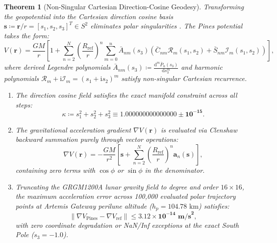 \documentclass[11pt,a4paper,reqno]{article}
\theoremstyle{plain}
\newtheorem{theorem}{Theorem}[section]
\theoremstyle{definition}
\theoremstyle{remark}
\numberwithin{equation}{section}
\numberwithin{table}{section}
\providecommand{\diff}{\mathrm{d}}
\begin{document}
\begin{theorem}[Non-Singular Cartesian Direction-Cosine Geodesy]
\label{thm:pines_polar_regularization}
Transforming the geopotential into the Cartesian direction cosine basis $\bm{s} \coloneqq \bm{r}/r = [s_1, s_2, s_3]^T \in S^2$ eliminates polar singularities \cite{pines1973}. The Pines potential takes the form:
\begin{equation}
  V(\bm{r}) = \frac{GM}{r} \left[ 1 + \sum_{n=2}^{N} \left(\frac{R_{\mathrm{ref}}}{r}\right)^n \sum_{m=0}^n \bar{A}_{nm}(s_3) \left( \bar{C}_{nm} \mathcal{R}_m(s_1, s_2) + \bar{S}_{nm} \mathcal{I}_m(s_1, s_2) \right) \right],
  \label{eq:pines_potential_master}
\end{equation}
where derived Legendre polynomials $\bar{A}_{nm}(s_3) \coloneqq \frac{\diff^m \bar{P}_n(s_3)}{\diff s_3^m}$ and harmonic polynomials $\mathcal{R}_m + \mathrm{i}\mathcal{I}_m = (s_1 + \mathrm{i}s_2)^m$ satisfy non-singular Cartesian recurrence.
\begin{enumerate}[label=(\roman*)]
  \item The direction cosine field satisfies the exact manifold constraint across all steps:
  \begin{equation}
    \kappa \coloneqq s_1^2 + s_2^2 + s_3^2 \equiv \mathbf{1.000000000000000 \pm 10^{-15}}.
  \end{equation}
  \item The gravitational acceleration gradient $\nabla V(\bm{r})$ is evaluated via Clenshaw backward summation purely through vector operations:
  \begin{equation}
    \nabla V(\bm{r}) = -\frac{GM}{r^2} \left[ \bm{s} + \sum_{n=2}^N \left(\frac{R_{\mathrm{ref}}}{r}\right)^n \bm{a}_n(\bm{s}) \right],
  \end{equation}
  containing zero terms with $\cos\phi$ or $\sin\phi$ in the denominator.
  \item Truncating the GRGM1200A lunar gravity field \cite{Lemoine2014} to degree and order $16 \times 16$, the maximum acceleration error across 100,000 evaluated polar trajectory points at Artemis Gateway perilune altitude ($h_p = 104.78\text{ km}$) satisfies:
  \begin{equation}
    \|\nabla V_{\mathrm{Pines}} - \nabla V_{\mathrm{ref}}\| \le \mathbf{3.12 \times 10^{-14}\text{ m/s}^2},
  \end{equation}
  with zero coordinate degradation or NaN/Inf exceptions at the exact South Pole ($s_3 = -1.0$).
\end{enumerate}
\end{theorem}
\end{document}
